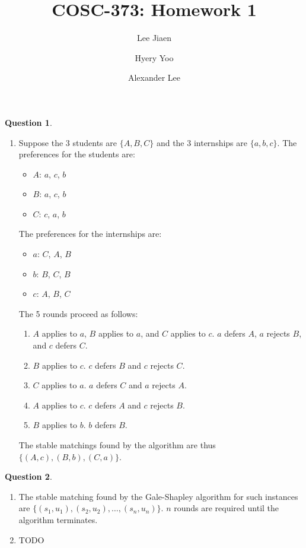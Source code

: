 \documentclass{amsart}
\title{COSC-373: Homework 1}
\author{Lee Jiaen}
\author{Hyery Yoo}
\author{Alexander Lee}
\theoremstyle{definition}
\newtheorem{question}{Question}
\begin{document}
\maketitle

\begin{question}
  \begin{enumerate}[label={(\alph*)}]
    \item Suppose the 3 students are $\{A, B, C\}$ and the 3 internships are
      $\{a, b, c\}$. The preferences for the students are:
      \begin{itemize}
        \item $A$: $a$, $c$, $b$
        \item $B$: $a$, $c$, $b$
        \item $C$: $c$, $a$, $b$
      \end{itemize}
      The preferences for the internships are:
      \begin{itemize}
        \item $a$: $C$, $A$, $B$
        \item $b$: $B$, $C$, $B$
        \item $c$: $A$, $B$, $C$
      \end{itemize}
      The 5 rounds proceed as follows:
      \begin{enumerate}[label={(\arabic*)}]
        \item $A$ applies to $a$, $B$ applies to $a$, and $C$ applies to $c$.
          $a$ defers $A$, $a$ rejects $B$, and $c$ defers $C$.
        \item $B$ applies to $c$. $c$ defers $B$ and $c$ rejects $C$.
        \item $C$ applies to $a$. $a$ defers $C$ and $a$ rejects $A$.
        \item $A$ applies to $c$. $c$ defers $A$ and $c$ rejects $B$.
        \item $B$ applies to $b$. $b$ defers $B$.
      \end{enumerate}
      The stable matchings found by the algorithm are thus $\{(A, c), (B, b),
      (C, a)\}$.
  \end{enumerate}
\end{question}

\begin{question}
  \begin{enumerate}[label={(\alph*)}]
    \item The stable matching found by the Gale-Shapley algorithm for such
      instances are $\{(s_1, u_1), (s_2, u_2), \ldots, (s_n, u_n)\}$. $n$ rounds
      are required until the algorithm terminates.
    \item TODO
  \end{enumerate}
\end{question}
\end{document}
